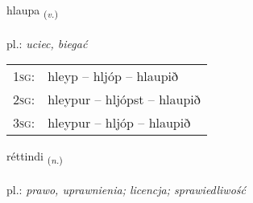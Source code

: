 \documentclass[frontgrid, backgrid]{flacards}\usepackage[]{graphicx}\usepackage[]{xcolor}
\begin{document}
\renewcommand{\flhead}{\vskip5pt \fboxsep=0pt {\small\bfseries\footnotesize Sagnorð | Verb}}
\renewcommand{\fcfoot}{\vskip5pt \fboxsep=0pt \hspace{2pt}{\small\bfseries\footnotesize 1K}}

\renewcommand{\blhead}{\vskip5pt {\small\bfseries\footnotesize Sagnorð | Verb }}
\renewcommand{\bcfoot}{\vskip5pt \hspace{2pt}{\small\bfseries\footnotesize 1K}}


{hlaupa \small{\textsubscript{(\textit{v.})}} \\[1ex] %
\textphonetic{[l̥œiːpa]} \\
pl.: \emph{uciec, biegać} \\  [2ex]
\renewcommand*{\arraystretch}{0.8}
\begin{tabular}{p{1cm}l}
\textsc{1sg}: & hleyp -- hljóp -- hlaupið \\ 
\textsc{2sg}: & hleypur -- hljópst -- hlaupið \\ 
\textsc{3sg}: & hleypur -- hljóp -- hlaupið \\ 
\end{tabular}
}

\renewcommand{\flhead}{\vskip5pt \fboxsep=0pt {\small\bfseries\footnotesize Nafnorð | Noun}}
\renewcommand{\fcfoot}{\vskip5pt \fboxsep=0pt \hspace{2pt}{\small\bfseries\footnotesize 1K}}

\renewcommand{\blhead}{\vskip5pt {\small\bfseries\footnotesize Nafnorð | Noun }}
\renewcommand{\bcfoot}{\vskip5pt \hspace{2pt}{\small\bfseries\footnotesize 1K}}


{réttindi \small{\textsubscript{(\textit{n.})}} \\[1ex] %
\textphonetic{[rjɛhtɪntɪ]} \\
pl.: \emph{prawo, uprawnienia; licencja;  sprawiedliwość} \\  [2ex]
\renewcommand*{\arraystretch}{0.8}
}
\end{document}
